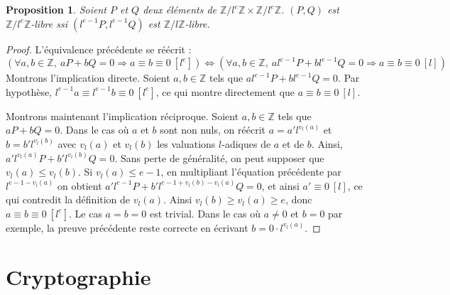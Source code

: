 \documentclass{article}
\theoremstyle{plain}%
\newtheorem{prop}[thm]{Proposition}
\theoremstyle{definition}%
\newcommand{\Z}{\mathbb{Z}}
\begin{document}
\begin{prop}
  Soient $P$ et $Q$ deux éléments de $\Z/l^e\Z \times \Z/l^e\Z$. 
  $(P, Q)$ est $\Z/l^e\Z $-libre ssi $(l^{e-1}P, l^{e-1}Q)$ est $\Z/l\Z $-libre. 
\end{prop}

\begin{proof}
  L'équivalence précédente se réécrit :
  $$\left( \forall a, b \in \Z,\ aP + bQ = 0 \Rightarrow a \equiv b \equiv 0\ [l^e] \right) \iff \left( \forall a, b \in \Z,\ a l^{e-1}P + b l^{e-1}Q = 0 \Rightarrow a \equiv b \equiv 0\ [l] \right) $$
  Montrons l'implication directe. Soient $a, b\in \Z$ tels que $a l^{e-1}P + b l^{e-1}Q = 0$. 
  Par hypothèse, $l^{e-1}a \equiv l^{e-1}b \equiv 0\ [l^e]$, ce qui montre directement que $a \equiv b \equiv 0\ [l]$. 

  Montrons maintenant l'implication réciproque. Soient $a, b \in \Z$ tels que $aP + bQ = 0$. 
  Dans le cas où $a$ et $b$ sont non nuls, on réécrit $a = a' l^{v_l(a)}$ et $b = b' l^{v_l(b)}$ avec $v_l(a)$ et $v_l(b)$ les valuations $l$-adiques de $a$ et de $b$. 
  Ainsi, $a' l^{v_l(a)}P + b' l^{v_l(b)}Q = 0$. 
  Sans perte de généralité, on peut supposer que $v_l(a) \le v_l(b)$. 
  Si $v_l(a) \le e-1$, en multipliant l'équation précédente par $l^{e-1-v_l(a)}$ on obtient $a' l^{e-1}P + b' l^{e-1 + v_l(b) - v_l(a)}Q = 0$, et ainsi $a' \equiv 0\ [l]$, ce qui contredit la définition de $v_l(a)$. 
  Ainsi $v_l(b) \ge v_l(a) \ge e$, donc $a \equiv b \equiv 0\ [l^e]$. Le cas $a=b=0$ est trivial. Dans le cas où $a\neq0$ et $b=0$ par exemple, la preuve précédente reste correcte en écrivant $b = 0\cdot l^{v_l(a)}$.
\end{proof}


\section{Cryptographie}
\end{document}

